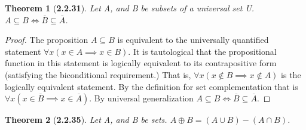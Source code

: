 \documentclass[a4paper, 12pt]{article}
\theoremstyle{plain}
\newtheorem*{theorem*}{Theorem}
\begin{document}
\pagebreak


\begin{theorem*}[\textbf{2.2.31}]
    Let A, and B be subsets of a universal set U. \newline 
    $A \subseteq B \iff \overline{B} \subseteq \overline{A}$.
\end{theorem*}

\begin{proof}
    The proposition $A \subseteq B$ is equivalent to the universally quantified statement 
    $\forall x ( x \in A \implies x \in B)$. It is tautological that the propositional 
    function in this statement is logically equivalent to its contrapositive form 
    (satisfying the biconditional requirement.) That is,  
    $\forall x (x \notin B \implies x \notin A)$ is the logically equivalent statement. 
    By the definition for set complementation that is 
    $\forall x (x \in \overline{B} \implies x \in \overline{A})$. By universal generalization 
    \newline $A \subseteq B \iff \overline{B} \subseteq \overline{A}$.
\end{proof}

\pagebreak


\begin{theorem*}[\textbf{2.2.35}]
    Let A, and B be sets. $A \oplus B = (A \cup B) - (A \cap B)$.
\end{theorem*}
\end{document}
